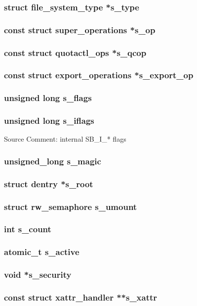 \documentclass{article}
\newcommand{\sourcecomment}[2][]{Source Comment: #2 \newline #1}
\begin{document}
\subsubsection{struct file_system_type *s_type}
\subsubsection{const struct super_operations *s_op}
\subsubsection{const struct quotactl_ops *s_qcop}
\subsubsection{const struct export_operations *s_export_op}
\subsubsection{unsigned long s_flags}
\subsubsection{unsigned long s_iflags}
\sourcecomment{internal SB_I_* flags}
\subsubsection{unsigned_long s_magic}
\subsubsection{struct dentry *s_root}
\subsubsection{struct rw_semaphore s_umount}
\subsubsection{int s_count}
\subsubsection{atomic_t s_active}
\subsubsection{void *s_security}
\subsubsection{const struct xattr_handler **s_xattr}
\end{document}
